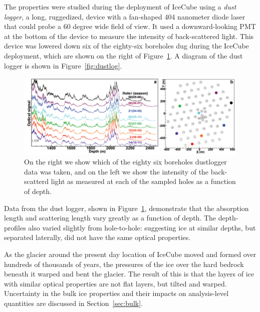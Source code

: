 \documentclass[main.tex]{subfiles}
\begin{document}
The properties were studied during the deployment of IceCube using a \textit{dust logger}, a long, ruggedized, device with a fan-shaped 404 nanometer diode laser that could probe a 60 degree wide field of view. 
It used a downward-looking PMT at the bottom of the device to measure the intensity of back-scattered light.
This device was lowered down six of the eighty-six boreholes dug during the IceCube deployment, which are shown on the right of Figure~\ref{fig:icetilt}.
A diagram of the dust logger is shown in Figure~\ref{fig:dustlog}.

\begin{figure}  
    \centering
    \includegraphics[width=0.8\linewidth]{figures/tilt.png}
    \caption{On the right we show which of the eighty six boreholes dustlogger data was taken, and on the left we show the intensity of the back-scatterd light as measured at each of the sampled holes as a function of depth.}\label{fig:icetilt}
\end{figure}

Data from the dust logger, shown in Figure~\ref{fig:icetilt}, demonstrate that the absorption length and scattering length vary greatly as a function of depth. 
The depth-profiles also varied slightly from hole-to-hole: suggesting ice at similar depths, but separated laterally, did not have the same optical properties.

As the glacier around the present day location of IceCube moved and formed over hundreds of thousands of years, the pressures of the ice over the hard bedrock beneath it warped and bent the glacier. 
The result of this is that the layers of ice with similar optical properties are not flat layers, but tilted and warped. 
Uncertainty in the bulk ice properties and their impacts on analysis-level quantities are discussed in Section~\ref{sec:bulk}.
\end{document}
